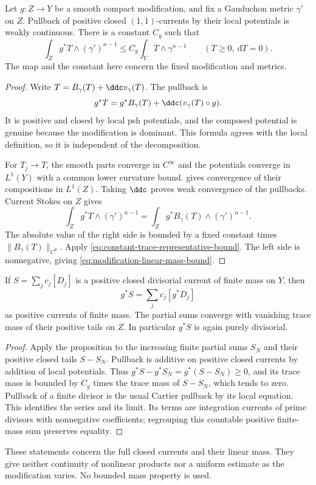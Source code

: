 \begin{proposition}\label{prop:closed-current-modification-continuity}
Let $g:Z\to Y$ be a smooth compact modification, and fix a Gauduchon metric $\gamma'$ on $Z$. Pullback of positive closed $(1,1)$-currents by their local potentials is weakly continuous. There is a constant $C_g$ such that
\begin{equation}\label{eq:modification-linear-mass-bound}
 \int_Zg^*T\wedge(\gamma')^{n-1}
       \leq C_g\int_YT\wedge\gamma^{n-1}
       \qquad(T\geq0,\ \mathrm{d}T=0).
\end{equation}
The map and the constant here concern the fixed modification and metrics.
\end{proposition}
\begin{proof}
Write $T=B_\gamma(T)+\ddc v_\gamma(T)$. The pullback is
\[
 g^*T=g^*B_\gamma(T)+\ddc(v_\gamma(T)\circ g).
\]
It is positive and closed by local psh potentials, and the composed potential is genuine because the modification is dominant. This formula agrees with the local definition, so it is independent of the decomposition.

For $T_j\to T$, the smooth parts converge in $C^\infty$ and the potentials converge in $L^1(Y)$ with a common lower curvature bound.  gives convergence of their compositions in $L^1(Z)$. Taking $\ddc$ proves weak convergence of the pullbacks. Current Stokes on $Z$ gives
\[
 \int_Zg^*T\wedge(\gamma')^{n-1}
   =\int_Zg^*B_\gamma(T)\wedge(\gamma')^{n-1}.
\]
The absolute value of the right side is bounded by a fixed constant times $\|B_\gamma(T)\|_{C^0}$. Apply \eqref{eq:constant-trace-representative-bound}. The left side is nonnegative, giving \eqref{eq:modification-linear-mass-bound}.
\end{proof}

\begin{corollary}\label{cor:countable-divisorial-pullback}
If $S=\sum_j c_j[D_j]$ is a positive closed divisorial current of finite mass on $Y$, then
\[
 g^*S=\sum_j c_j[g^*D_j]
\]
as positive currents of finite mass. The partial sums converge with vanishing trace mass of their positive tails on $Z$. In particular $g^*S$ is again purely divisorial.
\end{corollary}
\begin{proof}
Apply the proposition to the increasing finite partial sums $S_N$ and their positive closed tails $S-S_N$. Pullback is additive on positive closed currents by addition of local potentials. Thus $g^*S-g^*S_N=g^*(S-S_N)\geq0$, and its trace mass is bounded by $C_g$ times the trace mass of $S-S_N$, which tends to zero. Pullback of a finite divisor is the usual Cartier pullback by its local equation. This identifies the series and its limit. Its terms are integration currents of prime divisors with nonnegative coefficients; regrouping this countable positive finite-mass sum preserves equality.
\end{proof}

These statements concern the full closed currents and their linear mass. They give neither continuity of nonlinear products nor a uniform estimate as the modification varies. No bounded mass property is used.
